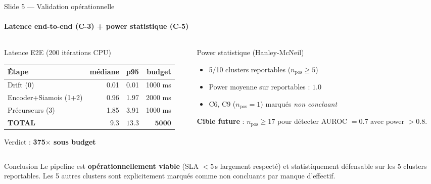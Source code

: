 \documentclass[10pt,aspectratio=169]{beamer}
\begin{document}
\begin{frame}{Slide 5 --- Validation opérationnelle}
  \framesubtitle{Latence end-to-end (C-3) + power statistique (C-5)}

  \begin{columns}[T]
    \begin{column}{0.55\textwidth}
      \begin{block}{Latence E2E (200 itérations CPU)}
        \scriptsize
        \begin{tabular}{lrrr}
          \toprule
          \textbf{Étape} & \textbf{médiane} & \textbf{p95} & \textbf{budget} \\
          \midrule
          Drift (0) & 0.01 & 0.01 & 1000 ms \\
          Encoder+Siamois (1+2) & 0.96 & 1.97 & 2000 ms \\
          Précurseurs (3) & 1.85 & 3.91 & 1000 ms \\
          \rowcolor{black!8}
          \textbf{TOTAL} & $\mathbf{9.3}$ & $\mathbf{13.3}$ & $\mathbf{5000}$ \\
          \bottomrule
        \end{tabular}
        \vspace{0.3em}
        Verdict : \textcolor{ewatgreen}{\textbf{\textbullet{} 375$\times$ sous budget}}
      \end{block}
    \end{column}

    \begin{column}{0.45\textwidth}
      \begin{block}{Power statistique (Hanley-McNeil)}
        \scriptsize
        \begin{itemize}
          \item 5/10 clusters reportables ($n_\text{pos} \geq 5$)
          \item Power moyenne sur reportables : $1.0$
          \item C6, C9 ($n_\text{pos} = 1$) marqués \emph{non concluant}
        \end{itemize}
        \vspace{0.3em}
        \textbf{Cible future} : $n_\text{pos} \geq 17$ pour détecter AUROC $= 0.7$ avec power $> 0.8$.
      \end{block}
    \end{column}
  \end{columns}

  \begin{block}{Conclusion}
    Le pipeline est \textbf{opérationnellement viable} (SLA $< 5$\,s largement
    respecté) et statistiquement défensable sur les 5 clusters reportables.
    Les 5 autres clusters sont explicitement marqués comme non concluants par
    manque d'effectif.
  \end{block}
\end{frame}
\end{document}

